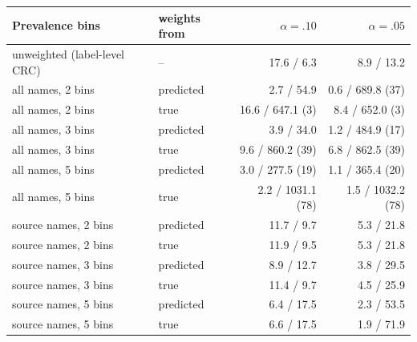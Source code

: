 \begin{tabular}{@{}llrr@{}}
\toprule
Prevalence bins & weights from & $\alpha=.10$ & $\alpha=.05$ \\
\midrule
unweighted (label-level CRC) & -- & 17.6 / 6.3 & 8.9 / 13.2 \\
\midrule
all names, 2 bins & predicted & 2.7 / 54.9 & 0.6 / 689.8 (37) \\
all names, 2 bins & true & 16.6 / 647.1 (3) & 8.4 / 652.0 (3) \\
all names, 3 bins & predicted & 3.9 / 34.0 & 1.2 / 484.9 (17) \\
all names, 3 bins & true & 9.6 / 860.2 (39) & 6.8 / 862.5 (39) \\
all names, 5 bins & predicted & 3.0 / 277.5 (19) & 1.1 / 365.4 (20) \\
all names, 5 bins & true & 2.2 / 1031.1 (78) & 1.5 / 1032.2 (78) \\
source names, 2 bins & predicted & 11.7 / 9.7 & 5.3 / 21.8 \\
source names, 2 bins & true & 11.9 / 9.5 & 5.3 / 21.8 \\
source names, 3 bins & predicted & 8.9 / 12.7 & 3.8 / 29.5 \\
source names, 3 bins & true & 11.4 / 9.7 & 4.5 / 25.9 \\
source names, 5 bins & predicted & 6.4 / 17.5 & 2.3 / 53.5 \\
source names, 5 bins & true & 6.6 / 17.5 & 1.9 / 71.9 \\
\bottomrule
\end{tabular}
